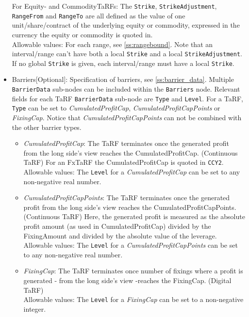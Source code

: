 \begin{itemize}
For Equity- and CommodityTaRFs: The \lstinline!Strike!, \lstinline!StrikeAdjustment!, \lstinline!RangeFrom! and \lstinline!RangeTo!  are all defined as the value of one
unit/share/contract of the underlying equity or commodity, expressed in the currency the equity or commodity is quoted in. \\
    
Allowable values: For each range, see \ref{ss:rangebound}. Note that an interval/range can't have both a local \lstinline!Strike!  and a local \lstinline!StrikeAdjustment!. If no global \lstinline!Strike! is given, each interval/range must have a local \lstinline!Strike!.

    \item Barriers[Optional]: Specification of barriers, see \ref{ss:barrier_data}. Multiple \lstinline!BarrierData! sub-nodes can be included within the \lstinline!Barriers! node. Relevant fields for each TaRF \lstinline!BarrierData! sub-node are \lstinline!Type! and \lstinline!Level!.  For a TaRF, \lstinline!Type! can be set to \emph{CumulatedProfitCap}, \emph{CumulatedProfitCapPoints} or \emph{FixingCap}. Notice that \emph{CumulatedProfitCapPoints} can not be combined with the other barrier types.
    
    \begin{itemize}
    \item \emph{CumulatedProfitCap}: The TaRF terminates once the generated profit from the long side's view reaches the
      CumulatedProfitCap. (Continuous TaRF) For an FxTaRF the CumulatedProfitCap is quoted in
      \lstinline!CCY2!. \\ Allowable values: The \lstinline!Level! for a \emph{CumulatedProfitCap} can be set to any
      non-negative real number.

    \item \emph{CumulatedProfitCapPoints}: The TaRF terminates once the generated profit from the long side's view
      reaches the CumulatedProfitCapPoints. (Continuous TaRF) Here, the generated profit is measured as the absolute
      profit amount (as used in CumulatedProfitCap) divided by the FixingAmount and divided by the absolute value of the
      leverage. \\ Allowable values: The \lstinline!Level! for a \emph{CumulatedProfitCapPoints} can be set to any
      non-negative real number.

    \item \emph{FixingCap}: The TaRF terminates once number of fixings where a profit is generated - from the long side's view -reaches the FixingCap. (Digital TaRF)\\
     Allowable values: The \lstinline!Level! for a \emph{FixingCap} can be set to a non-negative integer.
    \end{itemize}

\end{itemize}

